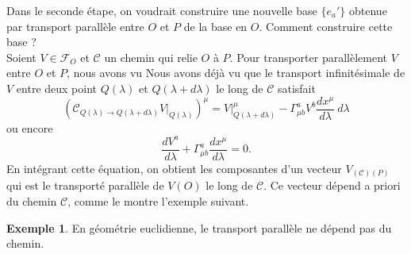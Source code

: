 \documentclass[a4paper,11pt]{report}
\theoremstyle{definition}
\theoremstyle{plain}
\theoremstyle{definition}
\newtheorem{exmp}{Exemple}[chapter]
\theoremstyle{remark}
\newcommand{\F}{\mathcal{F}}
\begin{document}
                Dans le seconde étape, on voudrait construire une nouvelle base $\{e_a'\}$ obtenue par transport parallèle entre $O$ et $P$ de la base en $O$. Comment construire cette base ?\\
                Soient $V\in\F_O$ et $\mathscr{C}$ un chemin qui relie $O$ à $P$. Pour transporter parallèlement $V$ entre $O$ et $P$, nous avons vu Nous avons déjà vu que le transport infinitésimale de $V$ entre deux point $Q(\lambda)$ et $Q(\lambda+d\lambda)$ le long de $\mathscr{C}$ satisfait
                \begin{equation}
                    \left(\mathscr{C}_{Q(\lambda)\to Q(\lambda+d\lambda)}V|_{Q(\lambda)}\right)^\mu = V|_{Q(\lambda+d\lambda)}^\mu-\Gamma^a_{\mu b}V^b \frac{dx^\mu}{d\lambda} ~d\lambda
                \end{equation}
                ou encore 
                \begin{equation}\label{eq:transportv}
                    \frac{dV^a}{d\lambda} + \Gamma^a_{\mu b}\frac{dx^\mu}{d\lambda} = 0.
                \end{equation}
                En intégrant cette équation, on obtient les composantes d'un vecteur $V_{(\mathscr{C})(P)}$ qui est le transporté parallèle de $V(O)$ le long de $\mathscr{C}$. Ce vecteur dépend a priori du chemin $\mathscr{C}$, comme le montre l'exemple suivant.
                
                \begin{exmp}
                    En géométrie euclidienne, le transport parallèle ne dépend pas du chemin.
                \end{exmp}
                
\end{document}
